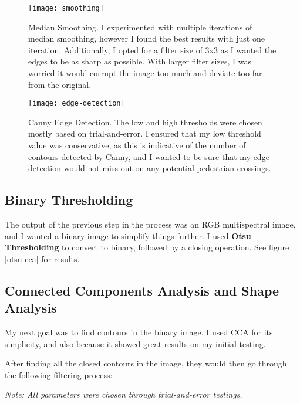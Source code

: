 \documentclass{article}  %
\begin{document}
	\begin{figure}[H]
		\begin{minipage}[c]{0.45\linewidth}
			\centering
			\texttt{[image: smoothing]}
			\caption{Median Smoothing. I experimented with multiple iterations of median smoothing, however I found the best results with just one iteration. Additionally, I opted for a filter size of 3x3 as I wanted the edges to be as sharp as possible. With larger filter sizes, I was worried it would corrupt the image too much and deviate too far from the original.}
		\end{minipage}\hfill
		\begin{minipage}[c]{0.45\linewidth}
			\centering
			\texttt{[image: edge-detection]}
			\caption{Canny Edge Detection. The low and high thresholds were chosen mostly based on trial-and-error. I ensured that my low threshold value was conservative, as this is indicative of the number of contours detected by Canny, and I wanted to be sure that my edge detection would not miss out on any potential pedestrian crossings.}
		\end{minipage}
	\end{figure}
	
	\subsection{Binary Thresholding}
	
	The output of the previous step in the process was an RGB multispectral image, and I wanted a binary image to simplify things further. I used \textbf{Otsu Thresholding} to convert to binary, followed by a closing operation. See figure \ref{otsu-cca} for results.
	
	\subsection{Connected Components Analysis and Shape Analysis}\label{cca}
	
	My next goal was to find contours in the binary image. I used CCA for its simplicity, and also because it showed great results on my initial testing.
	
	After finding all the closed contours in the image, they would then go through the following filtering process:
	
	\emph{Note: All parameters were chosen through trial-and-error testings.}
	
\end{document}
